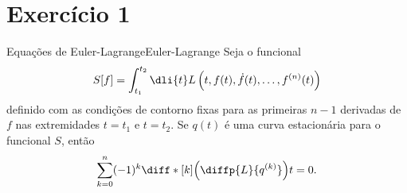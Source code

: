 \section*{Exercício 1}
\begin{lemma}{Equações de Euler-Lagrange}{Euler-Lagrange}
    Seja o funcional
    \begin{equation*}
        S[f] = \int_{t_1}^{t_2} \dli{t} L\left(t, f(t), \dot{f}(t), \dots, f^{(n)}(t)\right)
    \end{equation*}
    definido com as condições de contorno fixas para as primeiras \(n-1\) derivadas de \(f\) nas extremidades \(t = t_1\) e \(t = t_2\). Se \(q(t)\) é uma curva estacionária para o funcional \(S\), então
    \begin{equation*}
        \sum_{k = 0}^{n} (-1)^{k} \diff*[k]{\left(\diffp{L}{q^{(k)}}\right)}{t} = 0.
    \end{equation*}
\end{lemma}
